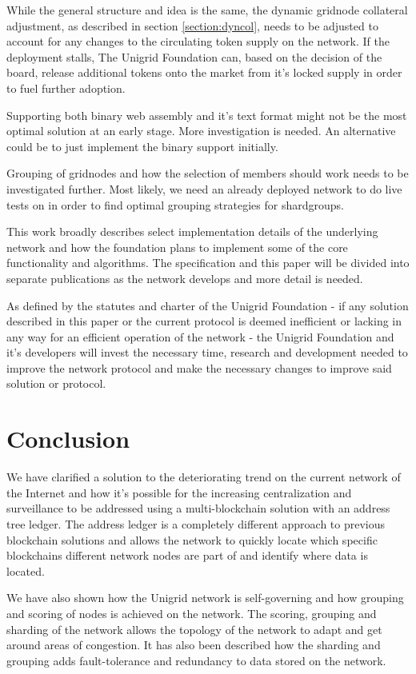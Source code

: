 \documentclass[10pt,a4paper,final]{article}
\begin{document}
While the general structure and idea is the same, the dynamic \gls{gridnode} collateral adjustment, as described in section \ref{section:dyncol}, needs to be adjusted to account for any changes to the circulating token supply on the network. If the deployment stalls, The Unigrid Foundation can, based on the decision of the board, release additional tokens onto the market from it's locked supply in order to fuel further adoption.

Supporting both binary web assembly and it's text format might not be the most optimal solution at an early stage. More investigation is needed. An alternative could be to just implement the binary support initially.

Grouping of \glspl{gridnode} and how the selection of members should work needs to be investigated further. Most likely, we need an already deployed network to do live tests on in order to find optimal grouping strategies for \glspl{shardgroup}.

This work broadly describes select implementation details of the underlying network and how the foundation plans to implement some of the core functionality and algorithms. The specification and this paper will be divided into separate publications as the network develops and more detail is needed.

As defined by the statutes \cite{unigridstatutes} and charter \cite{unigridcharter} of the Unigrid Foundation - if any solution described in this paper or the current protocol is deemed inefficient or lacking in any way for an efficient operation of the network - the Unigrid Foundation and it's developers will invest the necessary time, research and development needed to improve the network protocol and make the necessary changes to improve said solution or protocol.

\section{Conclusion}
We have clarified a solution to the deteriorating trend on the current network of the Internet and how it's possible for the increasing centralization and surveillance to be addressed using a multi-blockchain solution with an address tree ledger. The address ledger is a completely different approach to previous blockchain solutions and allows the network to quickly locate which specific blockchains different network nodes are part of and identify where data is located.

We have also shown how the Unigrid network is self-governing and how grouping and scoring of nodes is achieved on the network. The scoring, grouping and sharding of the network allows the topology of the network to adapt and get around areas of congestion. It has also been described how the sharding and grouping adds fault-tolerance and redundancy to data stored on the network.
\end{document}
